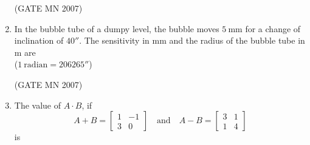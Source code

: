 \documentclass[journal]{IEEEtran}
\begin{document}
\begin{enumerate}
\begin{enumerate}
\end{enumerate}

\hfill (GATE MN 2007)

\item In the bubble tube of a dumpy level, the bubble moves $5 \ \mathrm{mm}$ for a change of inclination of $40''$. The sensitivity in mm and the radius of the bubble tube in m are \\
($1 \ \mathrm{radian} = 206265''$) \\
\begin{enumerate}
\end{enumerate}

\hfill (GATE MN 2007)

\item The value of $A \cdot B$, if 
\[
A + B = \begin{bmatrix} 1 & -1 \\ 3 & 0 \end{bmatrix}
\quad \text{and} \quad
A - B = \begin{bmatrix} 3 & 1 \\ 1 & 4 \end{bmatrix}
\]
is
\begin{enumerate}
\end{enumerate}


\end{enumerate}
\end{document}
